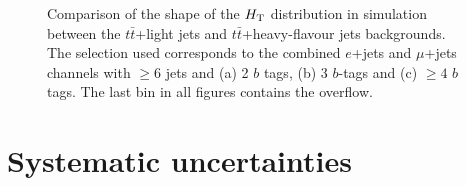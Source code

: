 \begin{figure}[h!tb]\begin{center}
	\caption{Comparison of the shape of the $\HT$ distribution in simulation between the $t\bar{t}$+light jets and $t\bar{t}$+heavy-flavour jets backgrounds.
The selection used corresponds to the combined $e$+jets and $\mu$+jets channels with $\geq 6$ jets and (a) 2 $b$ tags, 
(b) 3 $b$-tags and (c) $\geq 4$ $b$ tags. The last bin in all figures contains the overflow.\label{fig:HT_checks_ttjetsComp}}
\end{center}\end{figure}







\section{Systematic uncertainties}\label{sec:htxSYS}


